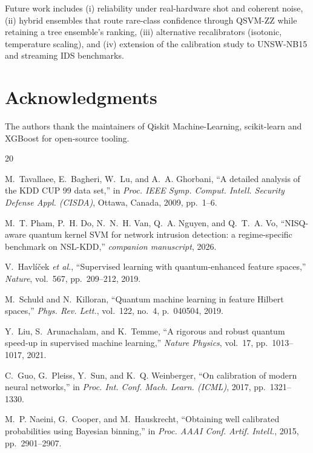\documentclass[journal]{IEEEtran}
\newcommand{\ZZ}{\textsc{ZZ}}
\newcommand{\QSVM}{QSVM-\ZZ}
\begin{document}
Future work includes (i) reliability under real-hardware shot and
coherent noise, (ii) hybrid ensembles that route rare-class confidence
through \QSVM{} while retaining a tree ensemble's ranking, (iii)
alternative recalibrators (isotonic, temperature scaling), and (iv)
extension of the calibration study to UNSW-NB15 and streaming IDS
benchmarks.

\section*{Acknowledgments}
The authors thank the maintainers of Qiskit Machine-Learning,
scikit-learn and XGBoost for open-source tooling.

\begin{thebibliography}{20}

M.~Tavallaee, E.~Bagheri, W.~Lu, and A.~A. Ghorbani,
``A detailed analysis of the KDD CUP 99 data set,'' in
\emph{Proc. IEEE Symp. Comput. Intell. Security Defense Appl. (CISDA)},
Ottawa, Canada, 2009, pp.~1--6.

M.~T. Pham, P.~H. Do, N.~N.~H. Van, Q.~A. Nguyen, and Q.~T.~A. Vo,
``NISQ-aware quantum kernel SVM for network intrusion detection: a
  regime-specific benchmark on NSL-KDD,'' \emph{companion manuscript},
  2026.

V.~Havl\'i\v{c}ek \emph{et al.},
``Supervised learning with quantum-enhanced feature spaces,''
\emph{Nature}, vol.~567, pp.~209--212, 2019.

M.~Schuld and N.~Killoran,
``Quantum machine learning in feature Hilbert spaces,''
\emph{Phys. Rev. Lett.}, vol.~122, no.~4, p.~040504, 2019.

Y.~Liu, S.~Arunachalam, and K.~Temme,
``A rigorous and robust quantum speed-up in supervised machine
  learning,'' \emph{Nature Physics}, vol.~17, pp.~1013--1017, 2021.

C.~Guo, G.~Pleiss, Y.~Sun, and K.~Q. Weinberger,
``On calibration of modern neural networks,'' in
\emph{Proc. Int. Conf. Mach. Learn. (ICML)}, 2017, pp.~1321--1330.

M.~P. Naeini, G.~Cooper, and M.~Hauskrecht,
``Obtaining well calibrated probabilities using Bayesian binning,''
in \emph{Proc. AAAI Conf. Artif. Intell.}, 2015, pp.~2901--2907.


\end{thebibliography}
\end{document}
